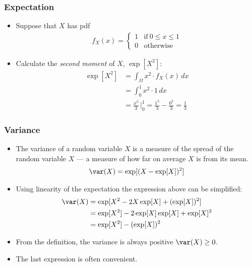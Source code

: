 \begin{frame}
\frametitle{Expectation} 
\begin{itemize}
\item Suppose that $X$ has pdf
\begin{align*}
f_X(x) = 
  \begin{cases}
  1 & \text{if}~ 0 \leq x \leq 1\\[1ex]
  0 & \text{otherwise}
  \end{cases}
\end{align*} 
\item Calculate the \emph{second moment} of $X$, $\exp[X^2]$:
\begin{align*}
\exp[X^2] 
    & = \int_{\Omega} x^2 \cdot f_X(x)\,dx \\
    & = \int_0^1 x^2 \cdot 1\,dx \\
    & = \frac{x^3}{3}\, \bigg|_0^1
      = \frac{1^3}{3}-\frac{0^3}{3}
      = \frac{1}{3}
\end{align*}
\end{itemize}
\end{frame}


\begin{frame}
\frametitle{Variance} 
\begin{itemize}
\item The variance of a random variable $X$ is a measure of the spread of the random variable $X$ --- a measure of how far on average $X$ is from its mean. 
\begin{align*}
\var(X) = \exp[(X-\exp[X])^2]
\end{align*}
\item Using linearity of the expectation the expression above can be simplified:
\begin{align*}
\var(X)
  & = \exp[X^2 - 2X\exp[X] + (\exp[X])^2] \\
  & = \exp[X^2]-2\exp[X]\exp[X] + \exp[X]^2\\
  & = \exp[X^2]-(\exp[X])^2
\end{align*}
\item From the definition, the variance is always positive $\var(X)\geq0$. 
\item The last expression is often convenient.
\end{itemize}
\end{frame}


